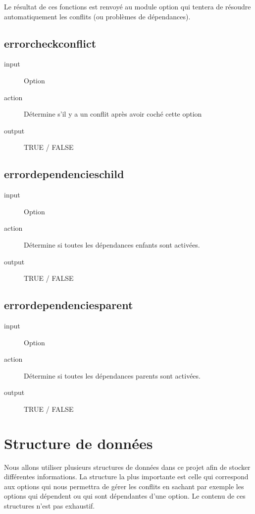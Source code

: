 \documentclass[16pts]{report}
\begin{document}
Le résultat de ces fonctions est renvoyé au module option qui tentera de
résoudre automatiquement les conflits (ou problèmes de dépendances).

\section{error\textunderscore check\textunderscore conflict}
\label{sec:error check conflict}
\begin{description}
    \item[input] Option
    \item[action] Détermine s’il y a un conflit après avoir coché cette option
    \item[output] TRUE / FALSE
\end{description}

\section{error\textunderscore dependencies\textunderscore child}
\label{sec:error dependencies child}
\begin{description}
    \item[input] Option
    \item[action] Détermine si toutes les dépendances enfants sont activées.
    \item[output] TRUE / FALSE
\end{description}

\section{error\textunderscore dependencies\textunderscore parent}
\label{sec:error dependencies parent}
\begin{description}
    \item[input] Option
    \item[action] Détermine si toutes les dépendances parents sont activées.
    \item[output] TRUE / FALSE
\end{description}

\chapter{Structure de données}
\label{cha:Structure de données}


Nous allons utiliser plusieurs structures de données dans ce projet afin de
stocker différentes informations. La structure la plus importante est celle qui
correspond aux options qui nous permettra de gérer les conflits en sachant par
exemple les options qui dépendent ou qui sont dépendantes d’une option. Le
contenu de ces structures n’est pas exhaustif.
\end{document}
